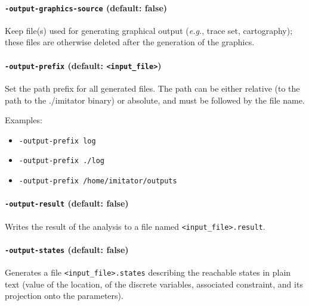 \documentclass[a4paper,11pt]{report}
\newcommand{\binimitator}{./imitator}
\newcommand{\styleOption}[1]{\textcolor{optioncolor}{\texttt{#1}}}
\newcommand{\stylePath}[1]{\textcolor{pathcolor}{\texttt{#1}}}
\newcommand{\eg}{\textcolor{colorok}{\textit{e.g.}, }}
\begin{document}
\paragraph{\styleOption{-output-graphics-source} (default: false)}
Keep file(s) used for generating graphical output (\eg{} trace set, cartography); these files are otherwise deleted after the generation of the graphics.


\paragraph{\styleOption{-output-prefix} (default: \stylePath{<input\_file>})}
Set the path prefix for all generated files.
The path can be either relative (to the path to the \binimitator{} binary) or absolute, and must be followed by the file name.

Examples:
\begin{itemize}
	\item \styleOption{-output-prefix log}
	\item \styleOption{-output-prefix ./log}
	\item \styleOption{-output-prefix /home/imitator/outputs}
\end{itemize}


\paragraph{\styleOption{-output-result} (default: false)}
Writes the result of the analysis to a file named \stylePath{<input\_file>.result}.




\paragraph{\styleOption{-output-states} (default: false)}
Generates a file \stylePath{<input\_file>.states} describing the reachable states in plain text (value of the location, of the discrete variables, associated constraint, and its projection onto the parameters).
\end{document}
